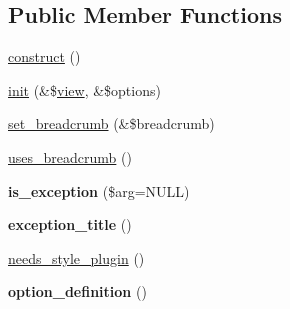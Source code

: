 \subsection*{Public Member Functions}
\begin{DoxyCompactItemize}
\item 
\hyperlink{classviews__handler__argument_a93594a31e95e1a14cead4f038d7b321b}{construct} ()
\item 
\hyperlink{classviews__handler__argument_a2c7e59a9df090d59d9d7d2827b6da85a}{init} (\&\$\hyperlink{classview}{view}, \&\$options)
\item 
\hyperlink{classviews__handler__argument_a06263489052be463efd3c4afdf73851d}{set\_\-breadcrumb} (\&\$breadcrumb)
\item 
\hyperlink{classviews__handler__argument_aa22155030bf440ff07a323569f80fd98}{uses\_\-breadcrumb} ()
\item 
\hypertarget{classviews__handler__argument_a2798ff5b2cea4109486813ff36f2f910}{
{\bfseries is\_\-exception} (\$arg=NULL)}
\label{classviews__handler__argument_a2798ff5b2cea4109486813ff36f2f910}

\item 
\hypertarget{classviews__handler__argument_a15eda018962f49a4a50242cf084f4e0a}{
{\bfseries exception\_\-title} ()}
\label{classviews__handler__argument_a15eda018962f49a4a50242cf084f4e0a}

\item 
\hyperlink{classviews__handler__argument_a2c09abe1e98de7438ca0701a14b00861}{needs\_\-style\_\-plugin} ()
\item 
\hypertarget{classviews__handler__argument_a117ab20a53624e082e6e32a22d4521cc}{
{\bfseries option\_\-definition} ()}
\label{classviews__handler__argument_a117ab20a53624e082e6e32a22d4521cc}


\end{DoxyCompactItemize}
